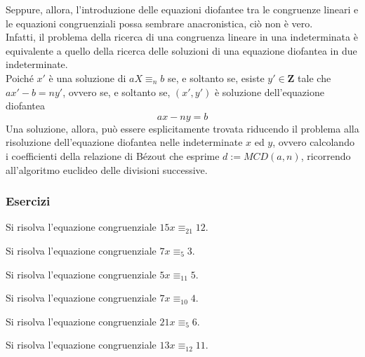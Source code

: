 \begin{flushleft}
Seppure, allora, l'introduzione delle equazioni diofantee tra le congruenze lineari e le equazioni congruenziali possa sembrare anacronistica, ciò non è vero.\\
Infatti, il problema della ricerca di una congruenza lineare in una indeterminata è equivalente a quello della ricerca delle soluzioni di una equazione diofantea in due indeterminate.\\
Poiché $x'$ è una soluzione di $aX \equiv_n b$ se, e soltanto se, esiste $y'\in \mathbf{Z}$ tale che $ax' - b = ny'$, ovvero se, e soltanto se, $(x', y')$ è soluzione dell'equazione diofantea
\[ax - ny = b\]
Una soluzione, allora, può essere esplicitamente trovata riducendo il problema alla risoluzione dell'equazione diofantea nelle indeterminate $x$ ed $y$, ovvero calcolando i coefficienti della relazione di Bézout che esprime $d := MCD(a, n)$, ricorrendo all'algoritmo euclideo delle divisioni successive.

\subsubsection{Esercizi}
\begin{esercizio}
Si risolva l'equazione congruenziale $15x \equiv_{21} 12$.
\end{esercizio}
\vspace{150px}


\begin{esercizio}
Si risolva l'equazione congruenziale $7x \equiv_5 3$.
\end{esercizio}
\vspace{150px}

\begin{esercizio}
Si risolva l'equazione congruenziale $5x \equiv_{11} 5$.
\end{esercizio}
\vspace{150px}

\begin{esercizio}
Si risolva l'equazione congruenziale $7x \equiv_{10} 4$.
\end{esercizio}
\vspace{150px}

\begin{esercizio}
Si risolva l'equazione congruenziale $21x \equiv_5 6$.
\end{esercizio}
\vspace{150px}

\begin{esercizio}
Si risolva l'equazione congruenziale $13x \equiv_{12} 11$.
\end{esercizio}
\vspace{150px}


\end{flushleft}

